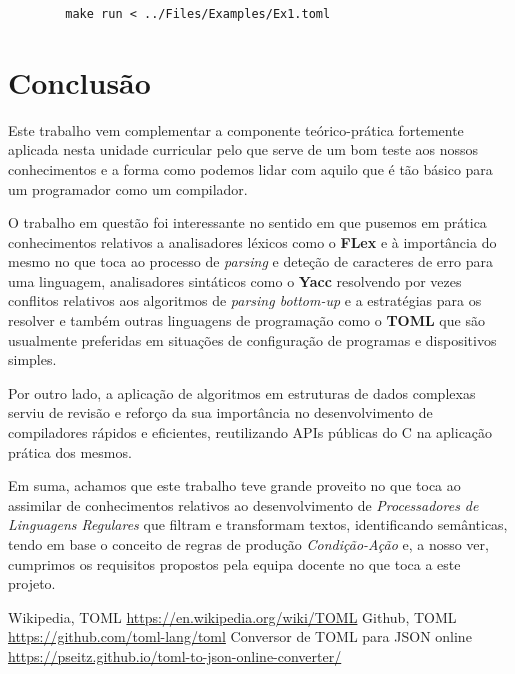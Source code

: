 \documentclass[a4paper,12pt]{report}
\begin{document}
\begin{verbatim}
        make run < ../Files/Examples/Ex1.toml
\end{verbatim}



\chapter{Conclusão}

Este trabalho vem complementar a componente teórico-prática fortemente aplicada nesta unidade curricular pelo que serve de um bom teste aos nossos conhecimentos e a forma como podemos lidar com aquilo que é tão básico para um programador como um compilador.
\par
O trabalho em questão foi interessante no sentido em que pusemos em prática conhecimentos relativos a analisadores léxicos como o \textbf{FLex} e à importância do mesmo no que toca ao processo de \textit{parsing} e deteção de caracteres de erro para uma linguagem, analisadores sintáticos como o \textbf{Yacc} resolvendo por vezes conflitos relativos aos algoritmos de \textit{parsing bottom-up} e a estratégias para os resolver e também outras linguagens de programação como o \textbf{TOML} que são usualmente preferidas em situações de configuração de programas e dispositivos simples. 
\par
Por outro lado, a aplicação de algoritmos em estruturas de dados complexas serviu de revisão e reforço da sua importância no desenvolvimento de compiladores rápidos e eficientes, reutilizando APIs públicas do C na aplicação prática dos mesmos.
\par Em suma, achamos que este trabalho teve grande proveito no que toca ao assimilar de conhecimentos relativos ao desenvolvimento de \textit{Processadores de Linguagens Regulares} que filtram e transformam textos, identificando semânticas, tendo em base o conceito de regras de produção \textit{Condição-Ação} e, a nosso ver, cumprimos os requisitos propostos pela equipa docente no que toca a este projeto.


\begin{thebibliography}{}
\bibitem{}
Wikipedia, TOML
\url{https://en.wikipedia.org/wiki/TOML}
\bibitem{}
Github, TOML
\url{https://github.com/toml-lang/toml}
\bibitem{}
Conversor de TOML para JSON online     
\url{https://pseitz.github.io/toml-to-json-online-converter/}
\end{thebibliography}
\end{document}
